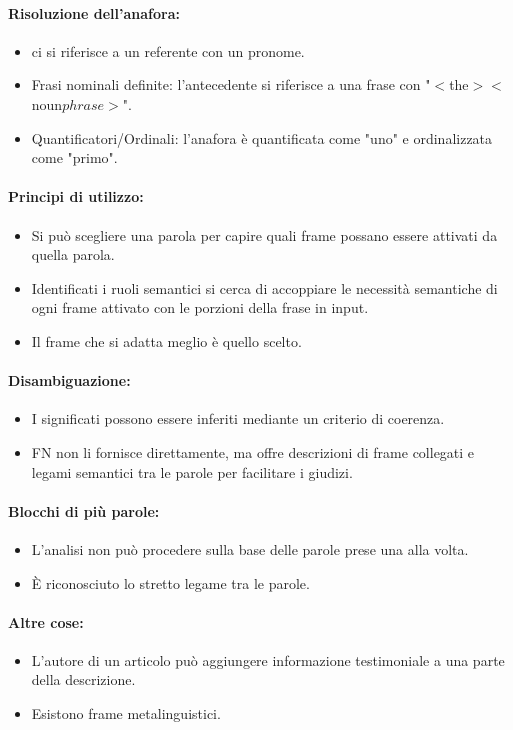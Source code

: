 \paragraph{Risoluzione dell'anafora:}

\begin{itemize}
  \item {} ci si riferisce a un referente con un pronome. 
  \item Frasi nominali definite: l'antecedente si riferisce a una frase con "$<$the$><$noun$ phrase>$". 
  \item Quantificatori/Ordinali: l'anafora è quantificata come "uno" e ordinalizzata come "primo".
\end{itemize}

\paragraph{Principi di utilizzo:}

\begin{itemize}
  \item Si può scegliere una parola per capire quali frame possano essere attivati da quella parola. 
  \item Identificati i ruoli semantici si cerca di accoppiare le necessità semantiche di ogni frame attivato con le porzioni della frase in input. 
  \item Il frame che si adatta meglio è quello scelto.
\end{itemize}

\paragraph{Disambiguazione:}

\begin{itemize}
  \item I significati possono essere inferiti mediante un criterio di coerenza. 
  \item FN non li fornisce direttamente, ma offre descrizioni di frame collegati e legami semantici tra le parole per facilitare i giudizi.
\end{itemize}

\paragraph{Blocchi di più parole:}

\begin{itemize}
  \item L'analisi non può procedere sulla base delle parole prese una alla volta. 
  \item È riconosciuto lo stretto legame tra le parole.
\end{itemize}

\paragraph{Altre cose:}

\begin{itemize}
  \item L'autore di un articolo può aggiungere informazione testimoniale a una parte della descrizione. 
  \item Esistono frame metalinguistici.
\end{itemize}

